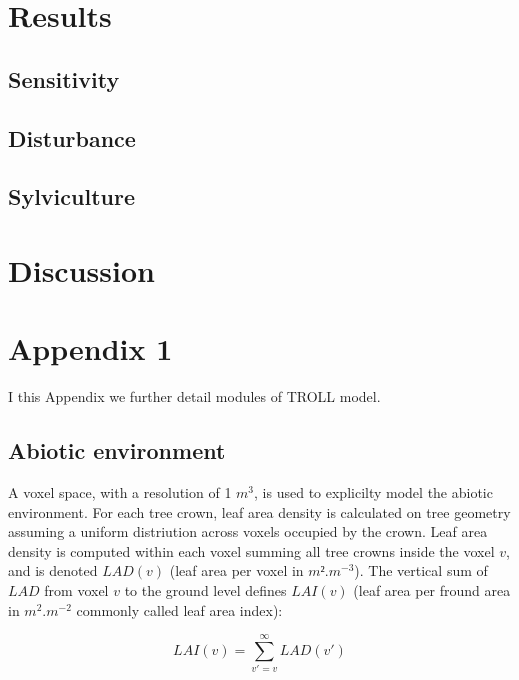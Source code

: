 \documentclass[12pt,]{article}
\let\oldsection\section
\renewcommand\section{\newpage\oldsection}
\theoremstyle{definition}
\theoremstyle{definition}
\theoremstyle{remark}
\begin{document}
\section{Results}\label{results}

\subsection{Sensitivity}\label{sensitivity}

\subsection{Disturbance}\label{disturbance-2}

\subsection{Sylviculture}\label{sylviculture-1}

\section{Discussion}\label{discussion}

\appendix


\hypertarget{appendix-1}{\section{Appendix 1}\label{appendix-1}}

I this Appendix we further detail modules of TROLL model.

\subsection{Abiotic environment}\label{abiotic-environment}

A voxel space, with a resolution of 1 \(m^3\), is used to explicilty
model the abiotic environment. For each tree crown, leaf area density is
calculated on tree geometry assuming a uniform distriution across voxels
occupied by the crown. Leaf area density is computed within each voxel
summing all tree crowns inside the voxel \(v\), and is denoted
\(LAD(v)\) (leaf area per voxel in \(m².m^{-3}\)). The vertical sum of
\(LAD\) from voxel \(v\) to the ground level defines \(LAI(v)\) (leaf
area per fround area in \(m^2.m^{-2}\) commonly called leaf area index):

\begin{equation}
  LAI(v) = \sum _{v'=v} ^\infty LAD(v') 
  \label{eq:LAI}
\end{equation}
\end{document}
